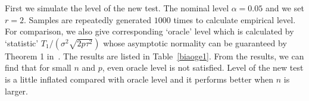 \documentclass[review]{elsarticle}
\theoremstyle{plain}
\theoremstyle{definition}
\theoremstyle{remark}
\begin{document}

First we simulate the level of the new test. The nominal level $\alpha=0.05$ and we set $r=2$. Samples are repeatedly generated $1000$ times to calculate empirical level.  For comparison, we also give corresponding `oracle' level which is calculated by `statistic' ${T_1}/(\sigma^2\sqrt{2p\tau^2})$ whose asymptotic normality can be guaranteed by Theorem 1 in~\cite{Chen2010A}. The results are listed in
Table~\ref{biaoge1}. From the results, we can find that for small $n$ and $p$, even oracle level is not satisfied. Level of the new test is  a little inflated compared with oracle level and it performs better when $n$ is larger.


\end{document}
